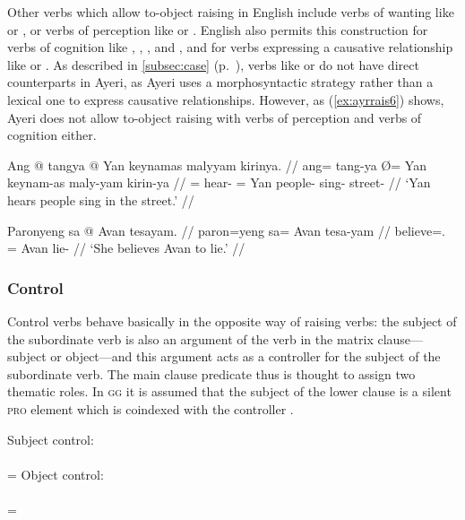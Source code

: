 Other verbs which allow to-object raising in English include verbs of wanting
like  or , or verbs of perception like  or .
English also permits this construction for verbs of cognition like
, , , and , and for verbs
expressing a causative relationship like  or . As described in
\autoref{subsec:case} (p.~\pageref{subsubsec:causative}), verbs like 
or  do not have direct counterparts in Ayeri, as Ayeri uses a
morphosyntactic strategy rather than a lexical one to express causative
relationships. However, as (\ref{ex:ayrrais6}) shows, Ayeri does not allow
to-object raising with verbs of perception and verbs of cognition either.

\pex\label{ex:ayrrais6}
\a\label{ex:ayrrais6_1}\ljudge*\begingl
	\gla Ang @ tangya {} @ Yan keynamas malyyam kirinya. //
	\glb ang= tang-ya Ø= Yan keynam-as maly-yam kirin-ya //
	\glc \Aarg{}= hear-\TsgM{} \Top{}= Yan people-\Parg{} sing-\Ptcp{}
		street-\Loc {} //
	\glft `Yan hears people sing in the street.' //
\endgl

\a\label{ex:ayrrais6_2}\ljudge*\begingl
	\gla Paronyeng sa @ Avan tesayam. //
	\glb paron=yeng sa= Avan tesa-yam //
	\glc believe=\TsgF{}.\Aarg{} \Parg{}= Avan lie-\Ptcp{} //
	\glft `She believes Avan to lie.' //
\endgl

\xe

\subsubsection{Control}
\label{subsubsec:control}

Control verbs behave basically in the opposite way of raising verbs: the
subject of the subordinate verb is also an argument of the verb in the matrix
clause---subject or object---and this argument acts as a controller for the
subject of the subordinate verb. The main clause predicate thus is thought to
assign two thematic roles. In \textsc{gg} it is assumed that the subject of the
lower clause is a silent \textsc{pro} element which is coindexed with the
controller \citep[442--445, 451]{carnie2013}.

\pex\label{ex:engctrl1}
\a Subject control:\medskip \\
	\\
	= 
\a Object control:\medskip \\
	\\
	= 
\xe


